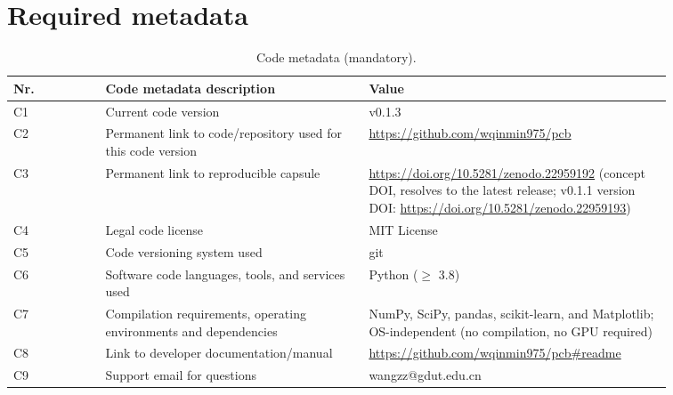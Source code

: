 \documentclass[3p]{elsarticle}
\begin{document}
\section{Required metadata}
\begin{table}[htbp]
\centering
\caption{Code metadata (mandatory).}
\begin{tabular}{lp{0.40\linewidth}p{0.46\linewidth}}
\toprule
\textbf{Nr.} & \textbf{Code metadata description} & \textbf{Value} \\
\midrule
C1 & Current code version & v0.1.3 \\
C2 & Permanent link to code/repository used for this code version & \url{https://github.com/wqinmin975/pcb} \\
C3 & Permanent link to reproducible capsule & \url{https://doi.org/10.5281/zenodo.22959192} (concept DOI, resolves to the latest release; v0.1.1 version DOI: \url{https://doi.org/10.5281/zenodo.22959193}) \\
C4 & Legal code license & MIT License \\
C5 & Code versioning system used & git \\
C6 & Software code languages, tools, and services used & Python ($\ge$ 3.8) \\
C7 & Compilation requirements, operating environments and dependencies & NumPy, SciPy, pandas, scikit-learn, and Matplotlib; OS-independent (no compilation, no GPU required) \\
C8 & Link to developer documentation/manual & \url{https://github.com/wqinmin975/pcb\#readme} \\
C9 & Support email for questions & wangzz@gdut.edu.cn \\
\bottomrule
\end{tabular}
\end{table}
\end{document}
